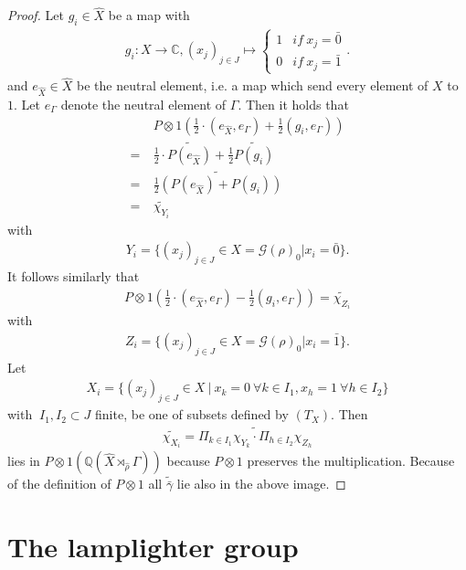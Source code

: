 \documentclass[12pt,a4paper]{scrartcl}
\theoremstyle{plain}
\theoremstyle{definition}
\numberwithin{equation}{section}
\newcommand{\C}{\mathbb{C}} %
\newcommand{\Q}{\mathbb{Q}} %
\newcommand{\2}{\mathbb{Z} / 2 \mathbb{Z}}
\newcommand{\G}{\mathcal{G}}
\newcommand{\1}{\bar{1}}
\newcommand{\0}{\bar{0}}
\begin{document}
\begin{proof}
	Let $g_i \in \hat{X}$ be a map with
	\begin{align*}
		g_i: X \to \C, (x_j)_{j \in J} \mapsto \begin{cases}
			1 & if \ x_j = \0 \\
			0 & if \ x_j = \1
		\end{cases}.
	\end{align*} 
	and $e_{\hat{X}} \in \hat{X}$ be the neutral element, i.e. a map which send every element of $X$ to $1$. Let $e_{\Gamma}$ denote the neutral element of $\Gamma$. Then it holds that
	\begin{align*}
		 &~ P \otimes 1(\frac{1}{2} \cdot (e_{\hat{X}}, e_{\Gamma}) + \frac{1}{2}(g_i, e_{\Gamma})) \\
		=&~ \frac{1}{2} \cdot \widetilde{P(e_{\hat{X}})} + \frac{1}{2} \widetilde{P(g_i)} \\
		=&~ \widetilde{\frac{1}{2}(P(e_{\hat{X}}) + P(g_i))} \\
		=&~ \tilde{\chi_{Y_i}}
	\end{align*}
	with
	\begin{align*}
		Y_i = \{(x_j)_{j \in J} \in X = \G (\rho)_0| x_i = \0\}.
	\end{align*} 
	It follows similarly that 
	\begin{align*}
		P \otimes 1(\frac{1}{2} \cdot (e_{\hat{X}}, e_{\Gamma}) - \frac{1}{2}(g_i, e_{\Gamma})) = \tilde{\chi_{Z_i}}
	\end{align*}
	with
	\begin{align*}
		Z_i = \{(x_j)_{j \in J} \in X = \G (\rho)_0| x_i = \1\}.
	\end{align*}
	Let 
	\begin{align*}
		X_i = \{(x_j)_{j \in J} \in X \ | \ x_k = 0 \ \forall k \in I_1, x_h = 1 \ \forall h \in I_2 \}
	\end{align*}
	with $\ I_1, I_2 \subset J$ finite, be one of subsets defined by $(T_X)$. Then 
	\begin{align*}
		\widetilde{\chi_{X_i}} = \widetilde{\Pi_{k \in I_1} \chi_{Y_k} \cdot \Pi_{h \in I_2} \chi_{Z_h}}
	\end{align*}
	lies in $P \otimes 1(\Q (\hat{X} \rtimes_{\hat{\rho}} \Gamma))$ because $P \otimes 1$ preserves the multiplication. Because of the definition of $P \otimes 1$ all $\tilde{\bar{\gamma}}$ lie also in the above image.
\end{proof}

\section{The lamplighter group} \label{chlamplighter}
\end{document}
